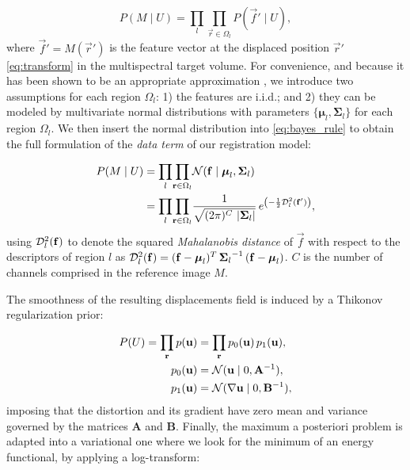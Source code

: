   \begin{equation}
  P(M \mid U) = \underset{l}{\prod} \underset{\vec{r}\in \Omega_l}{\prod}
    P\left( \vec{f}' \mid U \right),
  \label{eq:bayes_aposteriori}
  \end{equation}
%
  where $\vec{f}' = M(\vec{r}')$ is the feature vector at the displaced
  position $\vec{r}'$ \eqref{eq:transform} in the multispectral target
  volume.
For convenience, and because it has been shown to be an appropriate approximation
  \citep{leemput_automated_1999,cuadra_comparison_2005}, we introduce two assumptions for each
  region $\Omega_l$:
  1) the features are i.i.d.; and 2) they can be modeled by multivariate normal
  distributions with parameters $\lbrace \boldsymbol{\mu}_l, \boldsymbol{\Sigma}_{l} \rbrace$
  for each region $\Omega_l$.
We then insert the normal distribution into \eqref{eq:bayes_rule} to obtain the full
  formulation of the \emph{data term} of our registration model:

 	\begin{align}
  P( M \mid U) &= \underset{l}{\prod} \underset{\vec{r} \in \Omega_l}{\prod}
  \mathcal{N} ( \vec{f} \mid \boldsymbol{\mu}_l, \boldsymbol{\Sigma}_{l} ) \notag\\
  &= \underset{l}{\prod} \underset{\vec{r} \in \Omega_l}{\prod} \frac{1}{ \sqrt{(2\pi)^{C}\,\left|\boldsymbol{\Sigma}_{l}\right|}}\,{e^{\left(-\frac{1}{2}
  \mdist{f'}{l} \right)}},
  \label{eq:pdf}
  \end{align}
%
  using $\mdist{f}{l}$ to denote the squared \emph{Mahalanobis distance} of $\vec{f}$ with respect
  to the descriptors of region $l$ as
  $\mdist{f}{l} = (\vec{f} - \boldsymbol{\mu}_l)^T \, {\boldsymbol{\Sigma}_l}^{-1} \, (\vec{f} - \boldsymbol{\mu}_l)$.
$C$ is the number of channels comprised in the reference image $M$.


The smoothness of the resulting displacements field is induced by a Thikonov regularization
  prior:

  \begin{align}
  P(U) = \underset{\vec{r}}{\prod}\, p(\vec{u}) &=
  \underset{\vec{r}}{\prod}\, p_0(\vec{u}) \, p_1(\vec{u}), \\
  p_0(\vec{u}) &= \mathcal{N}( \vec{u} \mid 0, \mathbf{A}^{-1}), \notag\\
  p_1(\vec{u}) &= \mathcal{N}(  \nabla \vec{u} \mid 0, \mathbf{B}^{-1}),
  \label{eq:thikonov}
  \end{align}
%
  imposing that the distortion and its gradient have zero
  mean and variance governed by the matrices $\mathbf{A}$ and $\mathbf{B}$.
Finally, the maximum a posteriori problem is adapted into a variational one where we look for
  the minimum of an energy functional, by applying a log-transform:

